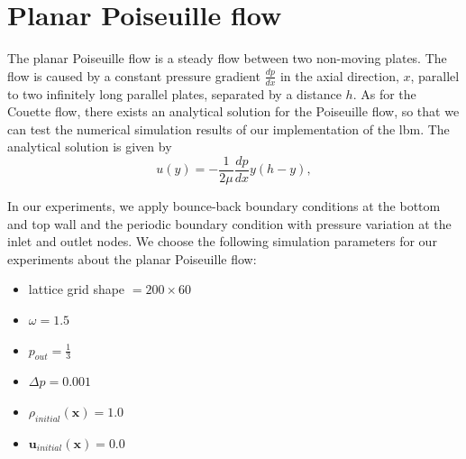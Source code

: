 \documentclass[a4paper,11pt, footsepline]{book}
\begin{document}
\section{Planar Poiseuille flow}\label{sec-pouseuille}
The planar Poiseuille flow is a steady flow between two non-moving plates. The flow is caused by a constant pressure gradient $\frac{dp}{dx}$ in the axial direction, $x$, parallel to two infinitely long parallel plates, separated by a distance $h$.
As for the Couette flow, there exists an analytical solution for the Poiseuille flow, so that we can test the numerical simulation results of our implementation of the \ac{lbm}. The analytical solution is given by
\begin{equation}
\label{eq:poiseuilleEq}
u(y)=-\frac{1}{2\mu}\frac{dp}{dx}y(h-y),
\end{equation} 

In our experiments, we apply bounce-back boundary conditions at the bottom and top wall and the periodic boundary condition with pressure variation at the inlet and outlet nodes.
We choose the following simulation parameters for our experiments about the planar Poiseuille flow:
\begin{itemize}
\setlength\itemsep{0.15em}
\item lattice grid shape $=200\times 60$
\item $\omega=1.5$
\item $p_{out}=\frac{1}{3}$
\item $\Delta p=0.001$
\item $\rho_{initial}(\mathbf{x})=1.0$
\item $\mathbf{u}_{initial}(\mathbf{x})=0.0$
\end{itemize}
\end{document}
